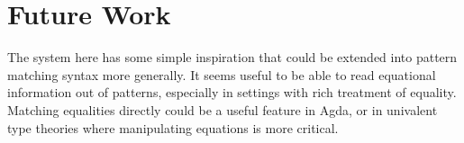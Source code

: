 
\section{Future Work}

The system here has some simple inspiration that could be extended into pattern matching syntax more generally. 
It seems useful to be able to read equational information out of patterns, especially in settings with rich treatment of equality.
Matching equalities directly could be a useful feature in Agda, or in univalent type theories where manipulating equations is more critical.%

